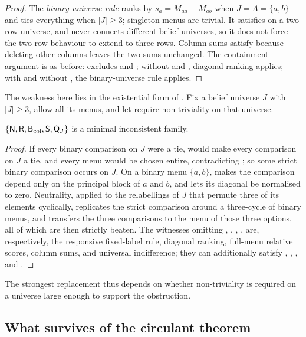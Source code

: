 \begin{proof}
The \emph{binary-universe rule} ranks by $s_a=M_{aa}-M_{ab}$ when $J=A=\{a,b\}$ and ties everything when
$|J|\ge3$; singleton menus are trivial. It satisfies  on a two-row universe, and \Bcol{} never
connects different belief universes, so it does not force the two-row behaviour to extend to three
rows. Column sums satisfy \Bcol{} because deleting other columns leaves the two sums unchanged. The
containment argument is as before:  excludes  and ; without  and ,
diagonal ranking applies; with  and without , the binary-universe rule applies.
\end{proof}

The weakness here lies in the existential form of . Fix a belief universe $J$ with $|J|\ge3$,
allow all its menus, and let \QJ{} require non-triviality on that universe.

\begin{theorem}\label{thm:five}
$\{\textup{\textsf{N}},\textup{\textsf{R}},\textup{\textsf{B}}_{\mathrm{col}},\textup{\textsf{S}},\textup{\textsf{Q}}_{J}\}$ is a minimal inconsistent family.
\end{theorem}

\begin{proof}
If every binary comparison on $J$ were a tie, \Bcol{} would make every comparison on $J$ a tie, and
every menu would be chosen entire, contradicting \QJ; so some strict binary comparison occurs on $J$.
On a binary menu $\{a,b\}$,  makes the comparison depend only on the principal block of $a$ and
$b$, and  lets its diagonal be normalised to zero. Neutrality, applied to the relabellings of
$J$ that permute three of its elements cyclically, replicates the strict comparison around a three-cycle
of binary menus, and \Bcol{} transfers the three comparisons to the menu of those three options, all of
which are then strictly beaten. The witnesses omitting , , \Bcol, , \QJ{} are,
respectively, the responsive fixed-label rule, diagonal ranking, full-menu relative scores, column
sums, and universal indifference; they can additionally satisfy , \Ccol, , and \Mon.
\end{proof}

The strongest replacement thus depends on whether non-triviality is required on a universe large
enough to support the obstruction.

\subsection{What survives of the circulant theorem}

